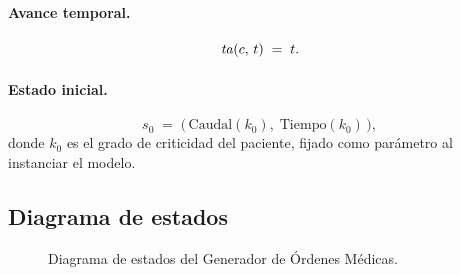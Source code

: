 \paragraph{Avance temporal.}
\[
  \mathit{ta}(c,\,t) \;=\; t.
\]

\paragraph{Estado inicial.}
\[
  s_0 \;=\; \bigl(\,\mathrm{Caudal}(k_0),\;\mathrm{Tiempo}(k_0)\,\bigr),
\]
donde $k_0$ es el grado de criticidad del paciente, fijado como parámetro
al instanciar el modelo.

\subsection{Diagrama de estados}

\begin{figure}[htbp]
\centering
{}
\caption{Diagrama de estados del Generador de Órdenes Médicas.}
\label{fig:diag_generador_med}
\end{figure}